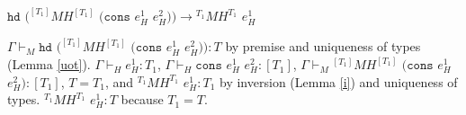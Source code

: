 \begin{case}
$\mathtt{hd}$ $(^{[T_{1}]}MH^{[T_{1}]}$ $(\mathtt{cons}$ $e_{H}^{1}$ $e_{H}^{2}))\rightarrow{^{T_{1}}M}H^{T_{1}}$ $e_{H}^{1}$

$\Gamma\vdash_{M}\mathtt{hd}$ $(^{[T_{1}]}MH^{[T_{1}]}$ $(\mathtt{cons}$ $e_{H}^{1}$ $e_{H}^{2})):T$ by premise and uniqueness of types (Lemma \ref{uot}).  $\Gamma\vdash_{H}e_{H}^{1}:T_{1}$, $\Gamma\vdash_{H}\mathtt{cons}$ $e_{H}^{1}$ $e_{H}^{2}:[T_{1}]$, $\Gamma\vdash_{M}{^{[T_{1}]}M}H^{[T_{1}]}$ $(\mathtt{cons}$ $e_{H}^{1}$ $e_{H}^{2}):[T_{1}]$, $T=T_{1}$, and $^{T_{1}}MH^{T_{1}}$ $e_{H}^{1}:T_{1}$ by inversion (Lemma \ref{i}) and uniqueness of types.  $^{T_{1}}MH^{T_{1}}$ $e_{H}^{1}:T$ because $T_{1}=T$.
\end{case}